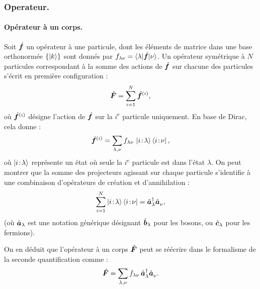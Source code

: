\subsubsection{Operateur. }


\paragraph{Opérateur à un corps.}

Soit \( \hat{\bm{f}} \) un opérateur à une particule, dont les éléments de matrice dans une base orthonormée \( \{ \ket{k} \} \) sont donnés par \( f_{\lambda\nu} = \langle \lambda \vert \hat{\bm{f}} \vert \nu \rangle \). Un opérateur symétrique à \( N \) particules correspondant à la somme des actions de \( \hat{\bm{f}} \) sur chacune des particules s’écrit en première configuration  :
\begin{eqnarray}
	\hat{\bm{F}} = \sum_{i=1}^N \hat{\bm{f}}^{(i)},
\end{eqnarray}
où \( \hat{\bm{f}}^{(i)} \) désigne l’action de \( \hat{\bm{f}} \) sur la $i^\text{e}$ particule uniquement. En base de Dirac, cela donne :
\begin{eqnarray}
	\hat{\bm{f}}^{(i)} = \sum_{\lambda, \nu} f_{\lambda\nu} \, \ket{i\!:\!\lambda} \bra{i\!:\!\nu},
\end{eqnarray}
où \( \ket{i\!:\!\lambda} \) représente un état où seule la $i^\text{e}$ particule est dans l’état \( \lambda \). %
On peut montrer que la somme des projecteurs agissant sur chaque particule s’identifie à une combinaison d’opérateurs de création et d’annihilation :
\begin{eqnarray}
	\sum_{i=1}^N \ket{i\!:\!\lambda} \bra{i\!:\!\nu} = \hat{\bm{a}}^\dagger_\lambda \hat{\bm{a}}_\nu^{},
\end{eqnarray}
(où \( \hat{\bm{a}}_\lambda \) est une notation générique désignant \( \hat{\bm{b}}_\lambda \) pour les bosons, ou \( \hat{\bm{c}}_\lambda \) pour les fermions).

On en déduit que l’opérateur à un corps \( \hat{\bm{F}} \) peut se réécrire dans le formalisme de la seconde quantification comme :
\begin{eqnarray}
	\hat{\bm{F}} = \sum_{\lambda, \nu} f_{\lambda\nu} \, \hat{\bm{a}}^\dagger_\lambda \hat{\bm{a}}_\nu^{}.
\end{eqnarray}


